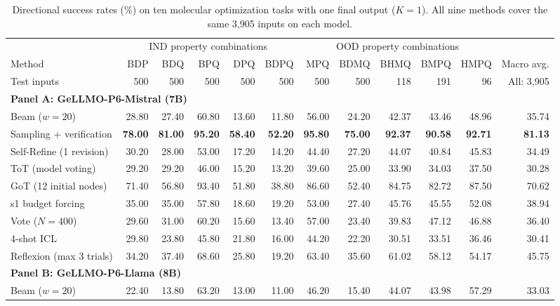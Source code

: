 \begin{table}[t]
\centering\EvalTableFont
\setlength{\tabcolsep}{2pt}\renewcommand{\arraystretch}{1.07}
\caption{Directional success rates (\%) on ten molecular optimization tasks with one final output ($K=1$). All nine methods cover the same 3,905 inputs on each model.}
\label{tab:effectiveness}\label{tab:tts_effectiveness}
\begin{tabular*}{\linewidth}{@{\extracolsep{\fill}}l *{11}{r}@{}}
\toprule
 & \multicolumn{5}{c}{IND property combinations} & \multicolumn{5}{c}{OOD property combinations} & \\
\cmidrule(lr){2-6}\cmidrule(lr){7-11}
Method & BDP & BDQ & BPQ & DPQ & BDPQ & MPQ & BDMQ & BHMQ & BMPQ & HMPQ & Macro avg. \\
Test inputs & 500 & 500 & 500 & 500 & 500 & 500 & 500 & 118 & 191 & 96 & All: 3,905 \\
\midrule
\multicolumn{12}{l}{\textbf{Panel A: GeLLMO-P6-Mistral (7B)}} \\
Beam ($w=20$) & 28.80 & 27.40 & 60.80 & 13.60 & 11.80 & 56.00 & 24.20 & 42.37 & 43.46 & 48.96 & 35.74 \\
Sampling + verification & \textbf{78.00} & \textbf{81.00} & \textbf{95.20} & \textbf{58.40} & \textbf{52.20} & \textbf{95.80} & \textbf{75.00} & \textbf{92.37} & \textbf{90.58} & \textbf{92.71} & \textbf{81.13} \\
Self-Refine (1 revision) & 30.20 & 28.00 & 53.00 & 17.20 & 14.20 & 44.40 & 27.20 & 44.07 & 40.84 & 45.83 & 34.49 \\
ToT (model voting) & 29.20 & 29.20 & 46.00 & 15.20 & 13.20 & 39.60 & 25.00 & 33.90 & 34.03 & 37.50 & 30.28 \\
GoT (12 initial nodes) & 71.40 & 56.80 & 93.40 & 51.80 & 38.80 & 86.60 & 52.40 & 84.75 & 82.72 & 87.50 & 70.62 \\
s1 budget forcing & 35.00 & 35.00 & 57.80 & 18.60 & 19.20 & 53.00 & 27.40 & 45.76 & 45.55 & 52.08 & 38.94 \\
Vote ($N=400$) & 29.60 & 31.00 & 60.20 & 15.60 & 13.40 & 57.00 & 23.40 & 39.83 & 47.12 & 46.88 & 36.40 \\
4-shot ICL & 29.80 & 23.80 & 45.80 & 21.80 & 16.00 & 44.20 & 22.20 & 30.51 & 33.51 & 36.46 & 30.41 \\
Reflexion (max 3 trials) & 34.20 & 37.40 & 68.60 & 25.80 & 19.20 & 63.40 & 35.60 & 61.02 & 58.12 & 54.17 & 45.75 \\
\midrule
\multicolumn{12}{l}{\textbf{Panel B: GeLLMO-P6-Llama (8B)}} \\
Beam ($w=20$) & 22.40 & 13.80 & 63.20 & 13.00 & 11.00 & 46.20 & 15.40 & 44.07 & 43.98 & 57.29 & 33.03 \\

\end{tabular*}
\end{table}
